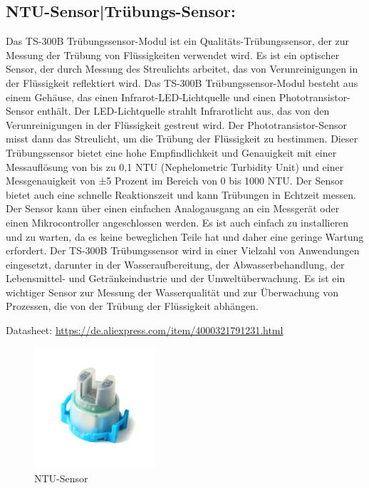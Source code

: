 \newpage
\subsection*{NTU-Sensor|Trübungs-Sensor:}
Das TS-300B Trübungssensor-Modul ist ein Qualitäts-Trübungssensor, der zur Messung der Trübung von Flüssigkeiten verwendet wird. 
Es ist ein optischer Sensor, der durch Messung des Streulichts arbeitet, das von Verunreinigungen in der Flüssigkeit reflektiert wird.
Das TS-300B Trübungssensor-Modul besteht aus einem Gehäuse, das einen Infrarot-LED-Lichtquelle und einen Phototransistor-Sensor enthält. 
Der LED-Lichtquelle strahlt Infrarotlicht aus, das von den Verunreinigungen in der Flüssigkeit gestreut wird. Der Phototransistor-Sensor misst dann das Streulicht, um die Trübung der Flüssigkeit zu bestimmen. 
Dieser Trübungssensor bietet eine hohe Empfindlichkeit und Genauigkeit mit einer Messauflösung von bis zu 0,1 NTU (Nephelometric Turbidity Unit) und einer Messgenauigkeit von ±5 Prozent im Bereich von 0 bis 1000 NTU. 
Der Sensor bietet auch eine schnelle Reaktionszeit und kann Trübungen in Echtzeit messen. Der Sensor kann über einen einfachen Analogausgang an ein Messgerät oder einen Mikrocontroller angeschlossen werden. Es ist auch einfach zu installieren und zu warten, da es keine beweglichen Teile hat und daher eine geringe Wartung erfordert. 
Der TS-300B Trübungssensor wird in einer Vielzahl von Anwendungen eingesetzt, darunter in der Wasseraufbereitung, der Abwasserbehandlung, der Lebensmittel- und Getränkeindustrie und der Umweltüberwachung. Es ist ein wichtiger Sensor zur Messung der Wasserqualität und zur Überwachung von Prozessen, die von der Trübung der Flüssigkeit abhängen. 


Datasheet: \url{https://de.aliexpress.com/item/4000321791231.html}

\begin{figure}[b]
    \centering
    \includegraphics[width=0.4\textwidth]{./pics/ntuSensorBild.jpeg}
    \caption{NTU-Sensor}
    \label{fig:NTU-Sensor}
\end{figure}



